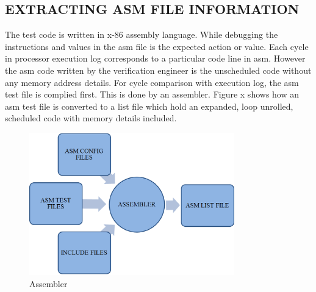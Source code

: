 \subsection {EXTRACTING ASM FILE INFORMATION}
The test code is written in x-86 assembly language. While debugging the instructions and values in the asm file is the expected action or value.  Each cycle in processor execution log corresponds to a particular code line in asm. However the asm code written by the verification engineer is the unscheduled code without any memory address details. For cycle comparison with execution log, the asm test file is complied first.  This is done by an assembler. Figure x shows how an asm test file is converted to a list file which hold an expanded, loop unrolled, scheduled code with memory details included.  
\begin{figure}[H]
\centering
\includegraphics[width=3.5in]{./figures/asm.eps}
\caption{Assembler}
\end{figure}



